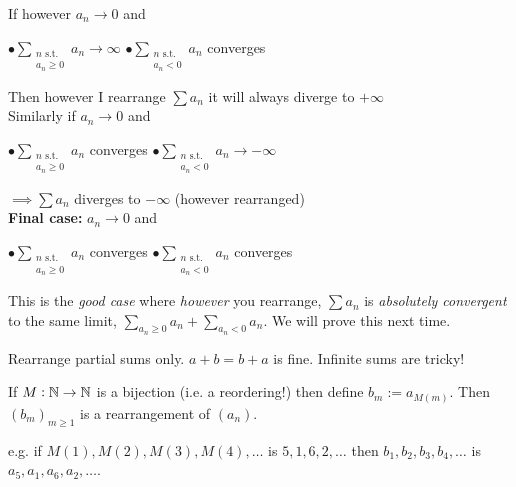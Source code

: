 \documentclass[twoside]{scrartcl}
\begin{document}
 If however $a_n \to 0$ and \vspace*{5pt}
 
   $\bullet \displaystyle{\sum_{\substack{n \text{ s.t.} \\a_n \geq 0}} a_n} \to \infty$\quad 
 $\bullet \displaystyle{\sum_{\substack{n \text{ s.t.}\\ a_n < 0}}  a_n}$ converges
 
 Then however I rearrange $\sum a_n$ it will always diverge to $+ \infty$~\\
 
 Similarly if $a_n \to 0$ and \vspace*{5pt}
 
 	$\bullet \displaystyle{\sum_{\substack{n \text{ s.t.} \\a_n \geq 0}} a_n}$ converges
 \quad $\bullet \displaystyle{\sum_{\substack{n \text{ s.t.}\\ a_n < 0}}  a_n} \to -\infty$ 
 
 $\implies  \sum a_n$ diverges to $-\infty$ (however rearranged)\\

\textbf{ Final case:} $a_n \to 0$ and 

 	$\bullet \displaystyle{\sum_{\substack{n \text{ s.t.} \\a_n \geq 0}} a_n}$ converges
 \quad $\bullet \displaystyle{\sum_{\substack{n \text{ s.t.}\\ a_n < 0}}  a_n}$ converges

This is the \emph{good case} where \emph{however} you rearrange, $\sum a_n$ is \emph{absolutely convergent} to the same limit, $\sum_{a_n \geq 0} a_n + \sum_{a_n < 0} a_n$. 
We will prove this next time.\\

\begin{remark} Rearrange partial sums only. $a+ b = b+a$ is fine. Infinite sums are tricky!	
\end{remark}\vspace*{5pt}


\begin{definition} 
	If $M: \mathbb{N} \to \mathbb{N}$ is a bijection (i.e. a reordering!) then define $b_m:= a_{M(m)}.$ Then $(b_m)_{m \geq 1}$ is a rearrangement of $(a_n)$.
\end{definition}

e.g. if $M(1), M(2), M(3), M(4),\dots$ is $5,1,6,2,\dots$ then $b_1,b_2,b_3,b_4,\dots$ is $a_5,a_1,a_6,a_2,\dots$.\\
\end{document}
